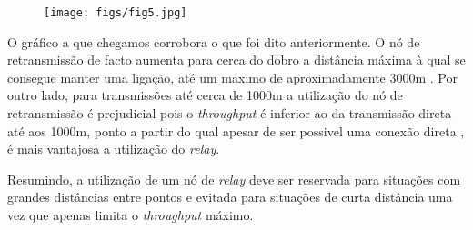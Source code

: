 \begin{figure}[H]
    \centering
    \texttt{[image: figs/fig5.jpg]}
    \caption{}
    \label{fig:5}
\end{figure}

O gráfico a que chegamos corrobora o que foi dito anteriormente. O nó de retransmissão de facto aumenta para cerca do dobro
a distância máxima à qual se consegue manter uma ligação, até um maximo de aproximadamente 3000m . Por outro lado, para transmissões até cerca de 1000m
a utilização do nó de retransmissão é prejudicial pois o \textit{throughput} é inferior ao da transmissão direta até aos 1000m, ponto a partir do qual apesar de ser
possivel uma conexão direta , é mais vantajosa a utilização do \textit{relay}.

Resumindo, a utilização de um nó de  \textit{relay} deve ser reservada para situações com grandes distâncias entre pontos e evitada para situações de curta distância 
uma vez que apenas limita o \textit{throughput} máximo.



